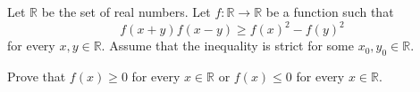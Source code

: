 Let $\mathbb{R}$ be the set of real numbers. Let $f\colon \mathbb{R} \to \mathbb{R}$ be a function such that
\[
f(x+y)f(x-y) \geq f(x)^2 - f(y)^2
\]
for every $x, y \in \mathbb{R}$. Assume that the inequality is strict for some $x_0, y_0 \in \mathbb{R}$.

Prove that $f(x) \geq 0$ for every $x \in \mathbb{R}$ or $f(x) \leq 0$ for every $x \in \mathbb{R}$.
